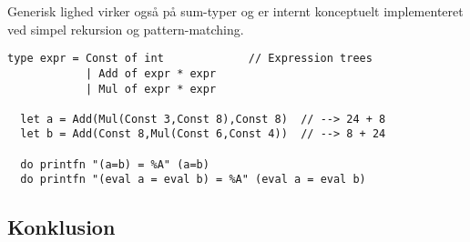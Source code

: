 \documentclass[rgb]{beamer}
\begin{document}
\begin{frame}[fragile]
\begin{footnotesize}

  \vspace{1ex}

  Generisk lighed virker også på sum-typer og er internt konceptuelt
  implementeret ved simpel rekursion og pattern-matching.


  \vspace{1ex}

\begin{lstlisting}[numbers=none,frame=none,mathescape]
  type expr = Const of int             // Expression trees
            | Add of expr * expr
            | Mul of expr * expr

  let a = Add(Mul(Const 3,Const 8),Const 8)  // --> 24 + 8
  let b = Add(Const 8,Mul(Const 6,Const 4))  // --> 8 + 24

  do printfn "(a=b) = %A" (a=b)
  do printfn "(eval a = eval b) = %A" (eval a = eval b)
\end{lstlisting}

\end{footnotesize}
\end{frame}

\subsection*{Konklusion}
\begin{frame}[fragile]

  \vspace{3mm}
  \tableofcontents
\end{frame}
\end{document}
